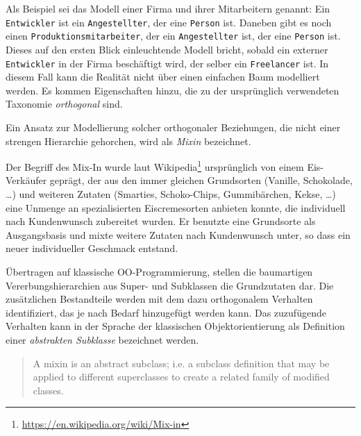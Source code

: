Als Beispiel sei das Modell einer Firma und ihrer Mitarbeitern genannt: Ein \texttt{Entwick\-ler} ist ein \texttt{Angestellter}, der eine \texttt{Person} ist. Daneben gibt es noch einen \texttt{Produktions\-mitarbeiter}, der ein \texttt{Angestellter} ist, der eine \texttt{Person} ist. Dieses auf den ersten Blick einleuchtende Modell bricht, sobald ein externer \texttt{Entwickler} in der Firma beschäftigt wird, der selber ein \texttt{Freelancer} ist. In diesem Fall  kann die Realität nicht über einen einfachen Baum modelliert werden. Es kommen Eigenschaften hinzu, die zu der ursprünglich verwendeten Taxonomie \emph{orthogonal} sind. 

Ein Ansatz zur Modellierung solcher orthogonaler Beziehungen, die nicht einer strengen Hierarchie gehorchen, wird als \emph{Mixin} bezeichnet. 

Der Begriff des Mix-In wurde laut Wikipedia\footnote{\url{https://en.wikipedia.org/wiki/Mix-in}} ursprünglich von einem Eis-Verkäufer geprägt, der aus den immer gleichen Grundsorten (Vanille, Schokolade, \ldots) und weiteren Zutaten (Smarties, Schoko-Chips, Gummibärchen, Kekse, \ldots) eine Unmenge an spezialisierten Eiscremesorten anbieten konnte, die individuell nach Kundenwunsch zubereitet wurden. Er benutzte eine Grundsorte als Ausgangsbasis und mixte weitere Zutaten nach Kundenwunsch unter, so dass ein neuer individueller Geschmack entstand. 

Übertragen auf klassische OO-Programmierung, stellen die baumartigen Vererbungshierarchien aus Super- und Subklassen die Grundzutaten dar. Die zusätzlichen Bestandteile werden mit dem dazu orthogonalem Verhalten identifiziert, das je nach Bedarf hinzugefügt werden kann. Das zuzufügende Verhalten kann in der Sprache der klassischen Objektorientierung als Definition einer \emph{abstrakten Subklasse} bezeichnet werden.

\begin{quote}
A mixin is an abstract subclass; i.e. a subclass definition that may be applied to different
superclasses to create a related family of modified classes.  \citep{BrachaMixinbasedInheritance1990}
\end{quote}

